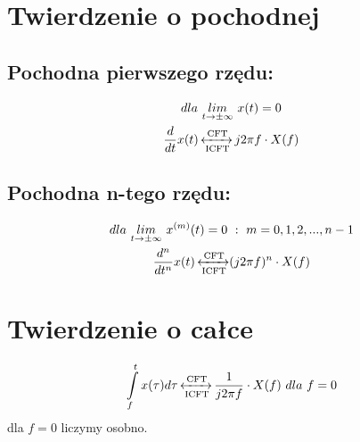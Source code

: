 \section{Twierdzenie o pochodnej}
    \subsection*{Pochodna pierwszego rzędu:}
        \begin{gather*}
            dla\ \underset{t\rightarrow\pm\infty}{lim}\ x(t) = 0\\
            \frac{d}{dt}x(t) \operatorname{\xleftrightarrow[\text{ICFT}]{\text{CFT}}} j2\pi f\cdot X(f)
        \end{gather*}
    \subsection*{Pochodna \textbf{n}-tego rzędu:}
        \begin{gather*}
            dla\ \underset{t\rightarrow\pm\infty}{lim}\ x^{(m)}(t) = 0\ :\ m = 0,1,2,...,n-1\\
            \frac{d^n}{dt^n}x(t)  \FT (j2\pi f)^{n}\cdot X(f)
        \end{gather*}

\section{Twierdzenie o całce}
    \begin{gather*}
        \int\limits^{t}_{f} x(\tau)d\tau \operatorname{\xleftrightarrow[\text{ICFT}]{\text{CFT}}} \frac{1}{j2\pi f}\cdot X(f)\ dla\ f=0
    \end{gather*}
        dla $f=0$ liczymy osobno.
    